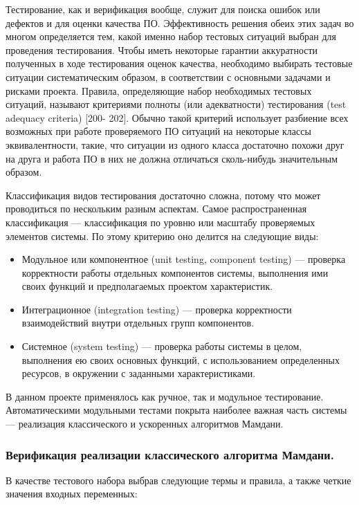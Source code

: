 Тестирование, как и верификация вообще, служит для поиска ошибок или дефектов и для оценки качества ПО. Эффективность решения обеих этих задач во многом определяется тем, какой именно набор тестовых ситуаций выбран для проведения тестирования. Чтобы иметь некоторые гарантии аккуратности полученных в ходе тестирования оценок качества, необходимо выбирать тестовые ситуации систематическим образом, в соответствии с основными задачами и рисками проекта. Правила, определяющие набор необходимых тестовых ситуаций, называют критериями полноты (или адекватности) тестирования (test adequacy criteria) [200- 202]. Обычно такой критерий использует разбиение всех возможных при работе проверяемого ПО ситуаций на некоторые классы эквивалентности, такие, что ситуации из одного класса достаточно похожи друг на друга и работа ПО в них не должна отличаться сколь-нибудь значительным образом.

Классификация видов тестирования достаточно сложна, потому что может проводиться по нескольким разным аспектам.  Самое распространенная классификация — классификация по уровню или масштабу проверяемых элементов системы. По этому критерию оно делится на следующие виды:


\begin{itemize}
	\item Модульное или компонентное (unit testing, component testing) — проверка корректности работы отдельных компонентов системы, выполнения ими своих функций и предполагаемых проектом характеристик.
	\item Интеграционное (integration testing) — проверка корректности взаимодействий внутри отдельных групп компонентов.
	\item Системное (system testing) — проверка работы системы в целом, выполнения ею своих основных функций, с использованием определенных ресурсов, в окружении с заданными характеристиками.
\end{itemize}

В данном проекте применялось как ручное, так и модульное тестирование. Автоматическими модульными тестами покрыта наиболее важная часть системы — реализация классического и ускоренных алгоритмов Мамдани.

\subsubsection{Верификация реализации классического алгоритма Мамдани. }

В качестве тестового набора выбрав следующие термы и правила, а также четкие значения входных переменных:

